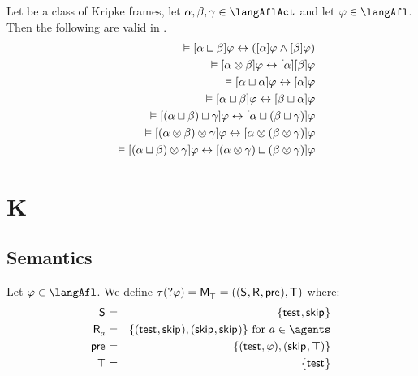 \begin{proposition}\label{afl-choice-sequential-validities}
Let \classC{} be a class of Kripke frames, let $\alpha, \beta, \gamma \in \langAflAct$ and let $\phi \in \langAfl$. Then the following are valid in \logicAflC{}.
\begin{eqnarray*}
    &&\vDash {[ {\alpha \sqcup\beta} ]} \varphi \leftrightarrow ({[ {\alpha} ]} \varphi \land {[ {\beta} ]} \varphi) \label{afl-axiom-choice}\\
    &&\vDash {[ {\alpha \otimes\beta} ]} \varphi \leftrightarrow {[ {\alpha} ]} {[ {\beta} ]} \varphi \label{afl-axiom-sequential}\\
    &&\vDash {[ {\alpha \sqcup\alpha} ]} \varphi \leftrightarrow {[ {\alpha} ]} \varphi\\
    &&\vDash {[ {\alpha \sqcup\beta} ]} \varphi \leftrightarrow {[ {\beta \sqcup\alpha} ]} \varphi\\
    &&\vDash {[ {(\alpha \sqcup\beta) \sqcup\gamma} ]} \varphi \leftrightarrow {[ {\alpha \sqcup(\beta \sqcup\gamma)} ]} \varphi\\
    &&\vDash {[ {(\alpha \otimes\beta) \otimes\gamma} ]} \varphi \leftrightarrow {[ {\alpha \otimes(\beta \otimes\gamma)} ]} \varphi\\
    &&\vDash {[ {(\alpha \sqcup\beta) \otimes\gamma} ]} \varphi \leftrightarrow {[ {(\alpha \otimes\gamma) \sqcup(\beta \otimes\gamma)} ]} \varphi
\end{eqnarray*}
\end{proposition}

\section{K}

\subsection{Semantics}

\begin{definition}[Test]\label{afl-k-test}
Let $\phi \in \langAfl$. 
We define $\tau(\test{\phi}) = \aPModel{\aStatesT} = \aPModelTuple{\aStatesT}$ where:
\begin{eqnarray*}
    \aStates &=& \{\aStateTest, \aStateSkip\}\\
    \aAccessibility{\agentA} &=& \{(\aStateTest, \aStateSkip), (\aStateSkip, \aStateSkip)\} \text{ for } \agentA \in \agents\\
    \aPrecondition &=& \{(\aStateTest, \phi), (\aStateSkip, \top)\}\\
    \aStatesT &=& \{\aStateTest\}
\end{eqnarray*}
\end{definition}

